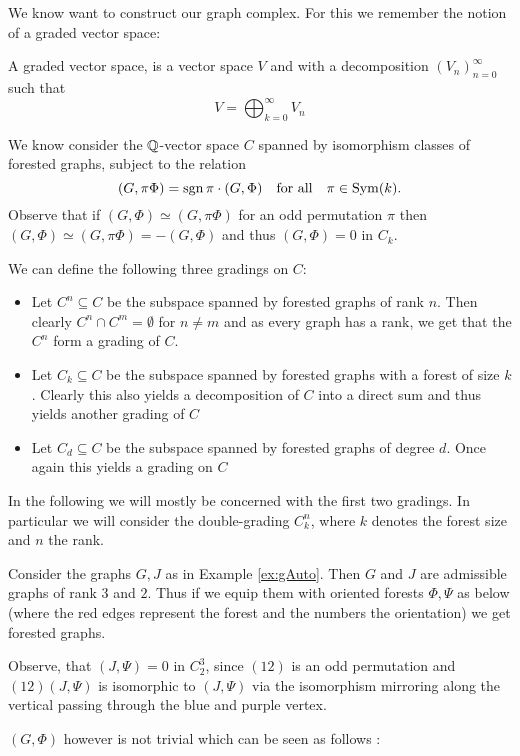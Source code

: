 We know want to construct our graph complex. For this we remember the notion of a graded vector space:
\begin{definition}
	A graded vector space, is a vector space $V$ and with a decomposition $\left(V_{n}\right)^{\infty}_{n=0} $ such that
	\[
		V = \bigoplus_{k=0}^{\infty} V_{n}
	\] 
\end{definition}

We know consider the $\mathbb{Q}$-vector space $C$ spanned by isomorphism classes of forested graphs, subject to the relation
\[
	(G,\pi \Phi) = \sgn{\pi} \cdot (G,\Phi) \qq{for all} \pi \in \on{Sym}(k)
.\]
Observe that if $(G,\Phi) \simeq (G,\pi \Phi)$ for an odd permutation $\pi$ then $(G,\Phi) \simeq (G,\pi \Phi) = - (G,\Phi)$ and thus $(G,\Phi) = 0$ in  $C_{k}$.

We can define the following three gradings on $C$:
 \begin{itemize}
	\item Let $C^{n} \subseteq C$ be the subspace spanned by forested graphs of rank $n$. Then clearly  $C^{n} \cap C^{m} = \emptyset$ for $n \neq m$ and
		as every graph has a rank, we get that the $C^{n}$ form a grading of $C$.
	\item Let $C_{k} \subseteq C$ be the subspace spanned by forested graphs with a forest of size $k$. Clearly this also yields a decomposition of $C$ into a direct sum
		and thus yields another grading of $C$
	\item Let  $C_{d} \subseteq C$ be the subspace spanned by forested graphs of degree $d$. Once again this yields a grading on $C$
\end{itemize}
In the following we will mostly be concerned with the first two gradings. In particular we will consider the double-grading $C_{k}^{n}$,
where $k$ denotes the forest size and $n$ the rank. 

\begin{eg}
	Consider the graphs $G, J$ as in Example \ref{ex:gAuto}. Then $G$ and $J$ are admissible graphs of rank $3$ and $2$. Thus if we equip them with oriented forests $\Phi, \Psi$ as below 
	(where the red edges represent the forest and the numbers the orientation) we get forested graphs.


	Observe, that $(J,\Psi) = 0$ in $C_{2}^{3}$, since $ (1 2)$ is an odd permutation and  $(1 2) (J,\Psi)$ is isomorphic to $(J,\Psi)$ 
	via the isomorphism mirroring along the vertical passing through the blue and purple vertex.

	$(G,\Phi)$ however is not trivial which can be seen as follows : 
\end{eg}

